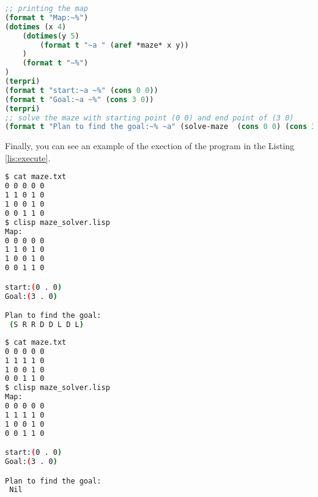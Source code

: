 \begin{lstlisting}[language=Lisp, style=mystyle,
                 caption=final part of program,
                 label=lis:final]
     ;; printing the map
(format t "Map:~%")        
(dotimes (x 4)
    (dotimes(y 5)
        (format t "~a " (aref *maze* x y))
    )
    (format t "~%")
)
(terpri)
(format t "start:~a ~%" (cons 0 0)) 
(format t "Goal:~a ~%" (cons 3 0)) 
(terpri)
;; solve the maze with starting point (0 0) and end point of (3 0)
(format t "Plan to find the goal:~% ~a" (solve-maze  (cons 0 0) (cons 3 0) (list (cons (cons 0 0) 'S)) ))         
\end{lstlisting}
Finally, you can see an example of the exection of the program in the
Listing \ref{lis:execute}. 
\begin{lstlisting}[language=Bash,
caption= Exectuion of the program,
label=lis:execute,
backgroundcolor=\color{backcolour},
keywordstyle=\color{magenta},
otherkeywords={clisp},
emph={$},
emphstyle={\color{deepblue}\ttfamily},
]
$ cat maze.txt
0 0 0 0 0 
1 1 0 1 0 
1 0 0 1 0
0 0 1 1 0
$ clisp maze_solver.lisp
Map:
0 0 0 0 0 
1 1 0 1 0 
1 0 0 1 0 
0 0 1 1 0 

start:(0 . 0) 
Goal:(3 . 0) 

Plan to find the goal:
 (S R R D D L D L)
\end{lstlisting}

\begin{lstlisting}[language=Bash,
caption= Exectuion of the program on a map with no existing path to end,
label=lis:execute,
backgroundcolor=\color{backcolour},
keywordstyle=\color{magenta},
otherkeywords={clisp},
emph={$},
emphstyle={\color{deepblue}\ttfamily},
]
$ cat maze.txt
0 0 0 0 0 
1 1 1 1 0 
1 0 0 1 0
0 0 1 1 0
$ clisp maze_solver.lisp
Map:
0 0 0 0 0 
1 1 1 1 0 
1 0 0 1 0 
0 0 1 1 0 

start:(0 . 0) 
Goal:(3 . 0) 

Plan to find the goal:
 Nil
\end{lstlisting}
